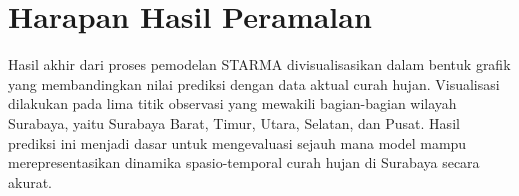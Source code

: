 \section{Harapan Hasil Peramalan}
Hasil akhir dari proses pemodelan STARMA divisualisasikan dalam bentuk grafik yang membandingkan nilai prediksi dengan data aktual curah hujan. Visualisasi dilakukan pada lima titik observasi yang mewakili bagian-bagian wilayah Surabaya, yaitu Surabaya Barat, Timur, Utara, Selatan, dan Pusat. Hasil prediksi ini menjadi dasar untuk mengevaluasi sejauh mana model mampu merepresentasikan dinamika spasio-temporal curah hujan di Surabaya secara akurat.